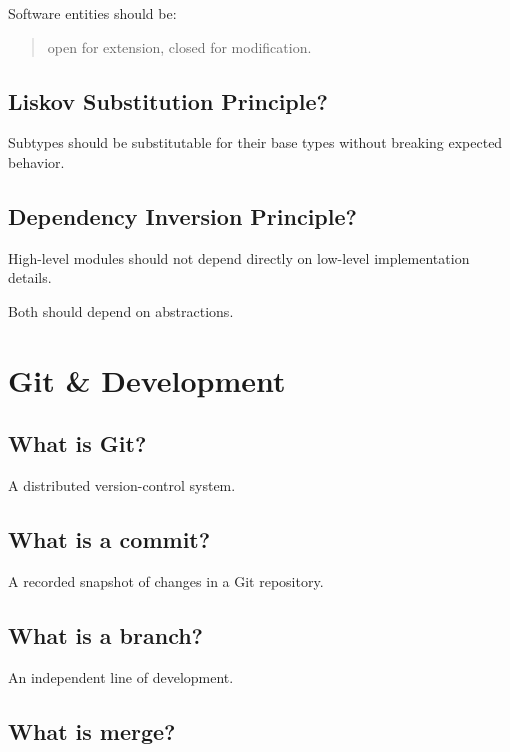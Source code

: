 Software entities should be:

\begin{quote}
open for extension, closed for modification.\\
\end{quote}

\medskip

\subsection{Liskov Substitution Principle?}

Subtypes should be substitutable for their base types without breaking expected behavior.

\medskip

\subsection{Dependency Inversion Principle?}

High-level modules should not depend directly on low-level implementation details.

Both should depend on abstractions.

\medskip

\section{Git \& Development}

\subsection{What is Git?}

A distributed version-control system.

\medskip

\subsection{What is a commit?}

A recorded snapshot of changes in a Git repository.

\medskip

\subsection{What is a branch?}

An independent line of development.

\medskip

\subsection{What is merge?}

